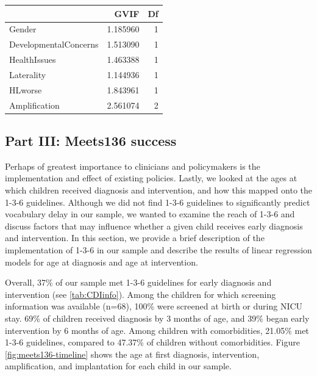 \documentclass[english,man]{apa6}
\begin{document}
\begin{table}[H]
\centering
\begin{tabular}{l|r|r}
\hline
  & GVIF & Df\\
\hline
Gender & 1.185960 & 1\\
\hline
DevelopmentalConcerns & 1.513090 & 1\\
\hline
HealthIssues & 1.463388 & 1\\
\hline
Laterality & 1.144936 & 1\\
\hline
HLworse & 1.843961 & 1\\
\hline
Amplification & 2.561074 & 2\\
\hline
\end{tabular}
\end{table}

\hypertarget{part-iii-meets136-success}{%
\subsection{Part III: Meets136 success}\label{part-iii-meets136-success}}

Perhaps of greatest importance to clinicians and policymakers is the implementation and effect of existing policies. Lastly, we looked at the ages at which children received diagnosis and intervention, and how this mapped onto the 1-3-6 guidelines. Although we did not find 1-3-6 guidelines to significantly predict vocabulary delay in our sample, we wanted to examine the reach of 1-3-6 and discuss factors that may influence whether a given child receives early diagnosis and intervention. In this section, we provide a brief description of the implementation of 1-3-6 in our sample and describe the results of linear regression models for age at diagnosis and age at intervention.

Overall, 37\% of our sample met 1-3-6 guidelines for early diagnosis and intervention (see \ref{tab:CDIinfo}). Among the children for which screening information was available (n=68), 100\% were screened at birth or during NICU stay. 69\% of children received diagnosis by 3 months of age, and 39\% began early intervention by 6 months of age. Among children with comorbidities, 21.05\% met 1-3-6 guidelines, compared to 47.37\% of children without comorbidities. Figure \ref{fig:meets136-timeline} shows the age at first diagnosis, intervention, amplification, and implantation for each child in our sample.
\end{document}
